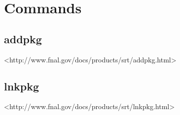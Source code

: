 \section{Commands}
\label{sec_commands}


\subsection{addpkg}
\label{com_addpkg}

<http://www.fnal.gov/docs/products/srt/addpkg.html>


\subsection{lnkpkg}
\label{com_lnkpkg}

<http://www.fnal.gov/docs/products/srt/lnkpkg.html>


